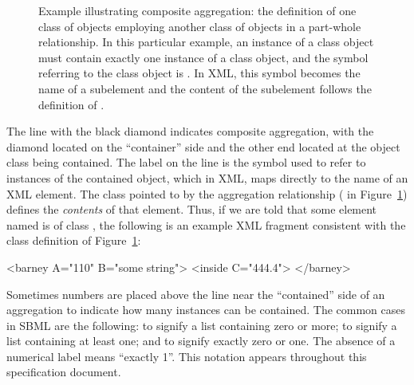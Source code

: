 \begin{figure}[htb]
  \centering
  \small
  \caption{Example illustrating composite
      aggregation: the definition of one class of objects
      employing another class of objects in a part-whole
      relationship.  In this particular example, an instance of a
       class object must contain exactly one instance
      of a  class object, and the symbol referring to
      the  class object is .  In XML,
      this symbol becomes the name of a subelement and the content
      of the subelement follows the definition of .}
  \label{fig:subelement-eg}
\end{figure}

The line with the black diamond indicates composite aggregation,
with the diamond located on the ``container'' side and the other
end located at the object class being contained.  The label on the
line is the symbol used to refer to instances of the contained
object, which in XML, maps directly to the name of an XML element.
The class pointed to by the aggregation relationship (
in Figure~\ref{fig:subelement-eg}) defines the \emph{contents} of
that element.  Thus, if we are told that some element named
 is of class , the following is an
example XML fragment consistent with the class definition of
Figure~\ref{fig:subelement-eg}:

\begin{example}
<barney A="110" B="some string">
    <inside C="444.4">
</barney>
\end{example}

Sometimes numbers are placed above the line near the ``contained''
side of an aggregation to indicate how many instances can be
contained.  The common cases in SBML are the following:
\token{[0..*]} to signify a list containing zero or more;
\token{[1..*]} to signify a list containing at least one; and
\token{[0..1]} to signify exactly zero or one.  The absence of a
numerical label means ``exactly 1''.  This notation appears
throughout this specification document.


